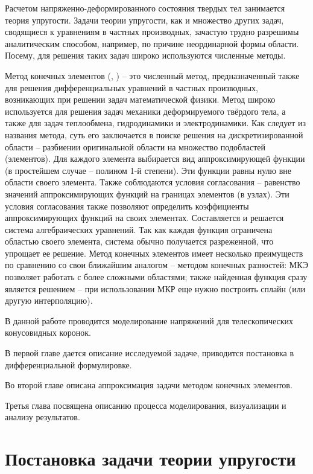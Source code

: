 \documentclass[a4paper, 14pt]{extreport}
\begin{document}
Расчетом напряженно-деформированного состояния 
твердых тел занимается теория упругости. Задачи теории
упругости, как и множество других задач, сводящиеся к
уравнениям в частных производных, зачастую трудно 
разрешимы аналитическим способом, например, по причине
неординарной формы области. Посему, для решения таких
задач широко используются численные методы.

Метод конечных элементов (\cite{finite_element_method},
\cite{projection_mesh_method}) -- это численный метод, 
предназначенный также для решения 
дифференциальных уравнений в частных производных, 
возникающих при решении задач математической физики. 
Метод широко используется для решения задач механики 
деформируемого твёрдого тела, а также для задач теплообмена, 
гидродинамики и электродинамики.
Как следует из названия метода, суть его заключается в поиске 
решения на дискретизированной области -- разбиении 
оригинальной области на множество подобластей (элементов).
Для каждого элемента выбирается вид аппроксимирующей
функции (в простейшем случае -- полином 1-й степени).
Эти функции равны нулю вне области своего элемента.
Также соблюдаются условия согласования -- равенство
значений  аппроксимирующих функций на границах элементов
 (в узлах). 
Эти условия согласования также позволяют определить 
коэффициенты аппроксимирующих функций на своих элементах.
Составляется и решается система алгебраических уравнений.
Так как каждая функция ограничена областью своего элемента, 
система обычно получается разреженной, что упрощает ее 
решение.
Метод конечных элементов имеет несколько преимуществ 
по сравнению со свои ближайшим аналогом -- методом 
конечных разностей: МКЭ позволяет работать с более 
сложными областями; также найденная функция сразу является 
решением -- при использовании МКР еще нужно построить
сплайн (или другую интерполяцию).

В данной работе проводится моделирование напряжений 
для телескопических конусовидных коронок.

В первой главе дается описание исследуемой задаче, 
приводится постановка в дифференциальной формулировке.

Во второй главе описана аппроксимация задачи методом
конечных элементов.

Третья глава посвящена описанию процесса моделирования, 
визуализации и анализу результатов.


\chapter{Постановка задачи теории упругости}
\end{document}
